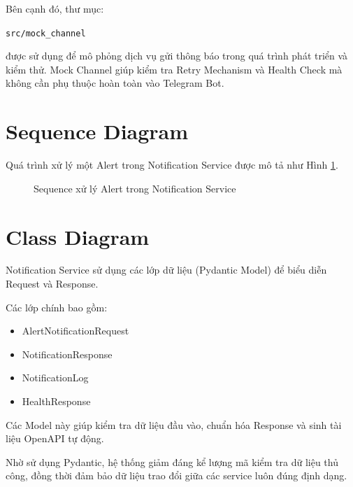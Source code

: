 Bên cạnh đó, thư mục:

\begin{center}
\texttt{src/mock\_channel}
\end{center}

được sử dụng để mô phỏng dịch vụ gửi thông báo trong quá trình phát triển và kiểm thử. Mock Channel giúp kiểm tra Retry Mechanism và Health Check mà không cần phụ thuộc hoàn toàn vào Telegram Bot.

\section{Sequence Diagram}

Quá trình xử lý một Alert trong Notification Service được mô tả như Hình \ref{fig:sequence}.

\begin{figure}[H]
\centering
{}
\caption{Sequence xử lý Alert trong Notification Service}
\label{fig:sequence}
\end{figure}

\section{Class Diagram}

Notification Service sử dụng các lớp dữ liệu (Pydantic Model) để biểu diễn Request và Response.

Các lớp chính bao gồm:

\begin{itemize}
\item AlertNotificationRequest
\item NotificationResponse
\item NotificationLog
\item HealthResponse
\end{itemize}

Các Model này giúp kiểm tra dữ liệu đầu vào, chuẩn hóa Response và sinh tài liệu OpenAPI tự động.

Nhờ sử dụng Pydantic, hệ thống giảm đáng kể lượng mã kiểm tra dữ liệu thủ công, đồng thời đảm bảo dữ liệu trao đổi giữa các service luôn đúng định dạng.
